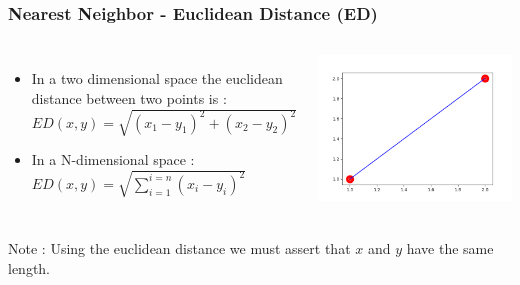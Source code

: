 \documentclass{beamer}
\begin{document}
\begin{frame}
\frametitle{Nearest Neighbor - Euclidean Distance (ED)}
\begin{columns}

\begin{itemize}
\item In a two dimensional space the euclidean distance between two points is :\\
$ ED(x,y) = \sqrt{(x_1 - y_1)^2 + (x_2 - y_2)^2} $
\item In a N-dimensional space : \\
$ ED(x,y) = \sqrt{\sum_{i=1}^{i=n}(x_i - y_i)^2} $
\end{itemize}
\centering
\includegraphics[scale=0.3]{ED.png}
\end{columns}
\begin{alertblock}{Note :}
Using the euclidean distance we must assert that $ x $ and $ y $ have the same length.
\end{alertblock}

\end{frame}
\end{document}

